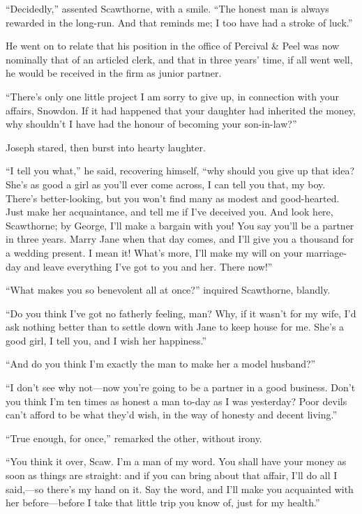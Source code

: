 ``Decidedly,'' assented Scawthorne, with a smile. ``The honest man is
always rewarded in the long-run. And that reminds me; I too have had a
stroke of luck.''

He went on to relate that his position in the office of Percival \& Peel
was now nominally that of an articled clerk, and that in three {}years'
time, if all went well, he would be received in the firm as junior
partner.

``There's only one little project I am sorry to give up, in connection
with your affairs, Snowdon. If it had happened that your daughter had
inherited the money, why shouldn't I have had the honour of becoming
your son-in-law?''

Joseph stared, then burst into hearty laughter.

``I tell you what,'' he said, recovering himself, ``why should you give
up that idea? She's as good a girl as you'll ever come across, I can
tell you that, my boy. There's better-looking, but you won't find many
as modest and good-hearted. Just make her acquaintance, and tell me if
I've deceived you. And look here, Scawthorne; by George, I'll make a
bargain with you! You say you'll be a partner in three years. Marry Jane
when that day comes, and I'll give you a thousand for a wedding present.
I mean it! What's more, I'll make my will on your marriage-day and leave
everything I've got to you and her. There now!''

``What makes you so benevolent all at once?'' inquired Scawthorne,
blandly.

{}``Do you think I've got no fatherly feeling, man? Why, if it wasn't
for my wife, I'd ask nothing better than to settle down with Jane to
keep house for me. She's a good girl, I tell you, and I wish her
happiness.''

``And do you think I'm exactly the man to make her a model husband?''

``I don't see why not---now you're going to be a partner in a good
business. Don't you think I'm ten times as honest a man to-day as I was
yesterday? Poor devils can't afford to be what they'd wish, in the way
of honesty and decent living.''

``True enough, for once,'' remarked the other, without irony.

``You think it over, Scaw. I'm a man of my word. You shall have your
money as soon as things are straight: and if you can bring about that
affair, I'll do all I said,---so there's my hand on it. Say the word,
and I'll make you acquainted with her before---before I take that little
trip you know of, just for my health.''

